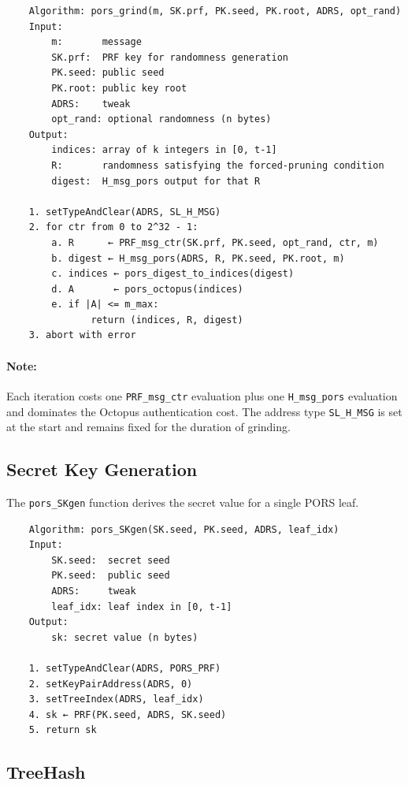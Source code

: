 \begin{verbatim}
    Algorithm: pors_grind(m, SK.prf, PK.seed, PK.root, ADRS, opt_rand)
    Input:
        m:       message
        SK.prf:  PRF key for randomness generation
        PK.seed: public seed
        PK.root: public key root
        ADRS:    tweak
        opt_rand: optional randomness (n bytes)
    Output:
        indices: array of k integers in [0, t-1]
        R:       randomness satisfying the forced-pruning condition
        digest:  H_msg_pors output for that R
 
    1. setTypeAndClear(ADRS, SL_H_MSG)
    2. for ctr from 0 to 2^32 - 1:
        a. R      ← PRF_msg_ctr(SK.prf, PK.seed, opt_rand, ctr, m)
        b. digest ← H_msg_pors(ADRS, R, PK.seed, PK.root, m)
        c. indices ← pors_digest_to_indices(digest)
        d. A       ← pors_octopus(indices)
        e. if |A| <= m_max:
               return (indices, R, digest)
    3. abort with error
\end{verbatim}
 
\paragraph{Note:} Each iteration costs one \texttt{PRF\_msg\_ctr} evaluation plus
one \texttt{H\_msg\_pors} evaluation and dominates the Octopus authentication cost. The address type \texttt{SL\_H\_MSG} is set
at the start and remains fixed for the duration of grinding.

\subsection{Secret Key Generation}
 
The \texttt{pors\_SKgen} function derives the secret value for a single PORS leaf.
 
\begin{verbatim}
    Algorithm: pors_SKgen(SK.seed, PK.seed, ADRS, leaf_idx)
    Input:
        SK.seed:  secret seed
        PK.seed:  public seed
        ADRS:     tweak
        leaf_idx: leaf index in [0, t-1]
    Output:
        sk: secret value (n bytes)
 
    1. setTypeAndClear(ADRS, PORS_PRF)
    2. setKeyPairAddress(ADRS, 0)
    3. setTreeIndex(ADRS, leaf_idx)
    4. sk ← PRF(PK.seed, ADRS, SK.seed)
    5. return sk
\end{verbatim}

\subsection{TreeHash}

